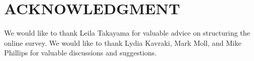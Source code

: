 \documentclass[letterpaper, 10 pt, conference]{ieeeconf}  %
\begin{document}






\section*{ACKNOWLEDGMENT}
We would like to thank Leila Takayama for valuable advice on structuring the online survey. We would like to thank Lydia Kavraki,  Mark Moll, and Mike Phillips for valuable discussions and suggestions. 


\end{document}
